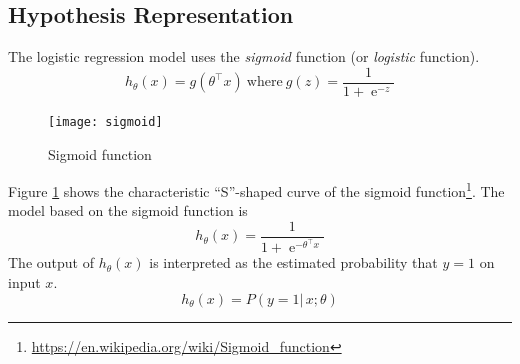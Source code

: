 \documentclass[a4paper,twoside,10pt]{article}
\begin{document}
\subsection{Hypothesis Representation}
The logistic regression model uses the \emph{sigmoid} function (or \emph{logistic} function).
\begin{equation*}
  h_\theta(x)=g(\theta^\top x)\mathrm{\ where\ }g(z)=\frac{1}{1+\operatorname{e}^{-z}}
\end{equation*}
\begin{figure}[htbp]
  \begin{center}
    \texttt{[image: sigmoid]}
    \caption{Sigmoid function\label{fig:sigmoid}}
  \end{center}
\end{figure}
Figure \ref{fig:sigmoid} shows the characteristic ``S''-shaped curve of the sigmoid function\footnote{\url{https://en.wikipedia.org/wiki/Sigmoid_function}}.
The model based on the sigmoid function is
\begin{equation*}
  h_\theta(x)=\frac{1}{1+\operatorname{e}^{-\theta^\top x}}
\end{equation*}
The output of $h_\theta(x)$ is interpreted as the estimated probability that $y=1$ on input $x$.
\begin{equation*}
  h_\theta(x)=P(y=1|\,x;\theta)
\end{equation*}
\end{document}
